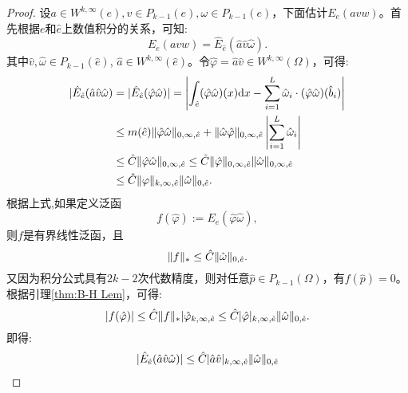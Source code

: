 \begin{proof}
    设$a\in W^{k,\infty}(e),v\in P_{k-1}(e),\omega\in P_{k-1}(e)$，下面估计$E_{e}(avw)$。首先根据$e$和$\hat{e}$上数值积分的关系，可知:
    \begin{equation}
        E_{e}(avw)=\hat{E}_{\hat{e}}(\hat{a}\hat{v}\hat{\omega}).
    \end{equation}
    其中$\hat{v},\hat{\omega}\in P_{k-1}(\hat{e})$, $\hat{a}\in W^{k,\infty}(\hat{e})$。令$\hat{\varphi}=\hat{a}\hat{v}\in W^{k,\infty}(\Omega)$，可得:
    \begin{equation}
        \begin{aligned}
            |\hat{E}_{\hat{e}}(\hat{a}\hat{v}\hat{\omega})&=|\hat{E}_{\hat{e}}(\hat{\varphi}\hat{\omega})|=\left|\int_{\hat{e}}(\hat{\varphi}\hat{\omega})(x)\mathrm{d} x-\sum_{i=1}^{L}\hat{\omega}_{i}\cdot(\hat{\varphi}\hat{\omega})(\hat{b}_{i})\right|\\
            &\le m(\hat{e})\|\hat{\varphi}\hat{\omega}\|_{0,\infty,\hat{e}}+\|\hat{\omega}\hat{\varphi}\|_{0,\infty,\hat{e}}\left|\sum_{i=1}^{L}\hat{\omega}_{i}\right|\\
            &\le \hat{C}\|\hat{\varphi}\hat{\omega}\|_{0,\infty,\hat{e}}\le\hat{C}\|\hat{\varphi}\|_{0,\infty,\hat{e}}\|\hat{\omega}\|_{0,\infty,\hat{e}}\\
            &\le\hat{C}\|\varphi\|_{k,\infty,\hat{e}}\|\hat{\omega}\|_{0,\hat{e}}.
        \end{aligned}
    \end{equation}
    根据上式,如果定义泛函
    \begin{equation}
        f(\hat{\varphi}):=E_{e}(\hat{\varphi}\hat{\omega}),
    \end{equation}
    则$f$是有界线性泛函，且
    \begin{equation}
        \|f\|_{*}\le\hat{C}\|\hat{\omega}\|_{0,\hat{e}}.
    \end{equation}
    又因为积分公式具有$2k-2$次代数精度，则对任意$\hat{p}\in P_{k-1}(\Omega)$，有$f(\hat{p})=0$。根据引理\ref{thm:B-H Lem}，可得:
    \begin{equation}
        |f(\hat{\varphi})|\le\hat{C}\|f\|_{*}|\hat{\varphi}_{k,\infty,\hat{e}}\le\hat{C}|\hat{\varphi}|_{k,\infty,\hat{e}}\|\hat{\omega}\|_{0,\hat{e}}.
    \end{equation}
    即得:
    \begin{equation}
        \label{eq:Eeavw}
        \begin{aligned}
            |\hat{E}_{\hat{e}}(\hat{a}\hat{v}\hat{\omega})|&\le\hat{C}|\hat{a}\hat{v}|_{k,\infty,\hat{e}}\norm{\hat{\omega}}_{0,\hat{e}}\\

\end{aligned}
\end{equation}
\end{proof}
